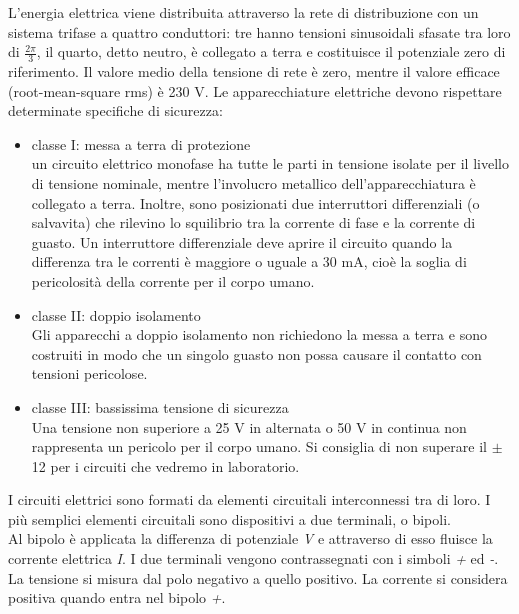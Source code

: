 \begin{defn}
	L'energia elettrica viene distribuita attraverso la rete di distribuzione con un sistema trifase a quattro conduttori: tre hanno tensioni sinusoidali sfasate tra loro di $\frac{2\pi}{3}$, il quarto, detto neutro, è collegato a terra e costituisce il potenziale zero di riferimento. Il valore medio della tensione di rete è zero, mentre il valore efficace (root-mean-square rms) è 230 V. 
	Le apparecchiature elettriche devono rispettare determinate specifiche di sicurezza: 
	\begin{itemize}
		\item classe I: messa a terra di protezione \\
		un circuito elettrico monofase ha tutte le parti in tensione isolate per il livello di tensione nominale, mentre l'involucro metallico dell'apparecchiatura è collegato a terra. Inoltre, sono posizionati due interruttori differenziali (o salvavita) che rilevino lo squilibrio tra la corrente di fase e la corrente di guasto. Un interruttore differenziale deve aprire il circuito quando la differenza tra le correnti è maggiore o uguale a 30 mA, cioè la soglia di pericolosità della corrente per il corpo umano. 
		\item classe II: doppio isolamento \\
		Gli apparecchi a doppio isolamento non richiedono la messa a terra e sono costruiti in modo che un singolo guasto non possa causare il contatto con tensioni pericolose.
		\item classe III: bassissima tensione di sicurezza \\
		Una tensione non superiore a 25 V in alternata o 50 V in continua non rappresenta un pericolo per il corpo umano. Si consiglia di non superare il $\pm$ 12 per i circuiti che vedremo in laboratorio. 
	\end{itemize}
\end{defn}

\begin{defn}
	I circuiti elettrici sono formati da elementi circuitali interconnessi tra di loro. I più semplici elementi circuitali sono dispositivi a due terminali, o bipoli. \\
	Al bipolo è applicata la differenza di potenziale \emph{V} e attraverso di esso fluisce la corrente elettrica \emph{I}. I due terminali vengono contrassegnati con i simboli \emph{+} ed \emph{-}. 
	La tensione si misura dal polo negativo a quello positivo. La corrente si considera positiva quando entra nel bipolo \emph{+}. 
\end{defn}

